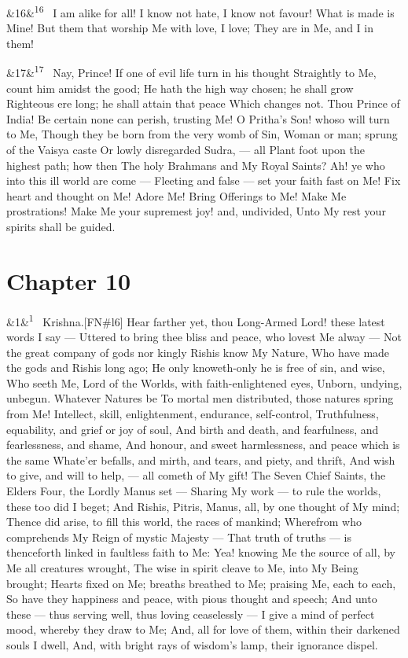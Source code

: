 \documentclass[12pt]{article}
\newcommand{\para}[1][]{\par\noindent\ifx&#1&\else\textsuperscript{\footnotesize #1}~\fi}
\begin{document}
\para[16] I am alike for all! I know not hate, I know not favour! What is made is Mine! But them that worship Me with love, I love; They are in Me, and I in them!

\para[17] Nay, Prince! If one of evil life turn in his thought Straightly to Me, count him amidst the good; He hath the high way chosen; he shall grow Righteous ere long; he shall attain that peace Which changes not. Thou Prince of India! Be certain none can perish, trusting Me! O Pritha's Son! whoso will turn to Me, Though they be born from the very womb of Sin, Woman or man; sprung of the Vaisya caste Or lowly disregarded Sudra, --- all Plant foot upon the highest path; how then The holy Brahmans and My Royal Saints? Ah! ye who into this ill world are come --- Fleeting and false --- set your faith fast on Me! Fix heart and thought on Me! Adore Me! Bring Offerings to Me! Make Me prostrations! Make Me your supremest joy! and, undivided, Unto My rest your spirits shall be guided.

\section*{Chapter 10}

\para[1] Krishna.[FN\#l6] Hear farther yet, thou Long-Armed Lord! these latest words I say --- Uttered to bring thee bliss and peace, who lovest Me alway --- Not the great company of gods nor kingly Rishis know My Nature, Who have made the gods and Rishis long ago; He only knoweth-only he is free of sin, and wise, Who seeth Me, Lord of the Worlds, with faith-enlightened eyes, Unborn, undying, unbegun. Whatever Natures be To mortal men distributed, those natures spring from Me! Intellect, skill, enlightenment, endurance, self-control, Truthfulness, equability, and grief or joy of soul, And birth and death, and fearfulness, and fearlessness, and shame, And honour, and sweet harmlessness, and peace which is the same Whate'er befalls, and mirth, and tears, and piety, and thrift, And wish to give, and will to help, --- all cometh of My gift! The Seven Chief Saints, the Elders Four, the Lordly Manus set --- Sharing My work --- to rule the worlds, these too did I beget; And Rishis, Pitris, Manus, all, by one thought of My mind; Thence did arise, to fill this world, the races of mankind; Wherefrom who comprehends My Reign of mystic Majesty --- That truth of truths --- is thenceforth linked in faultless faith to Me: Yea! knowing Me the source of all, by Me all creatures wrought, The wise in spirit cleave to Me, into My Being brought; Hearts fixed on Me; breaths breathed to Me; praising Me, each to each, So have they happiness and peace, with pious thought and speech; And unto these --- thus serving well, thus loving ceaselessly --- I give a mind of perfect mood, whereby they draw to Me; And, all for love of them, within their darkened souls I dwell, And, with bright rays of wisdom's lamp, their ignorance dispel.
\end{document}
